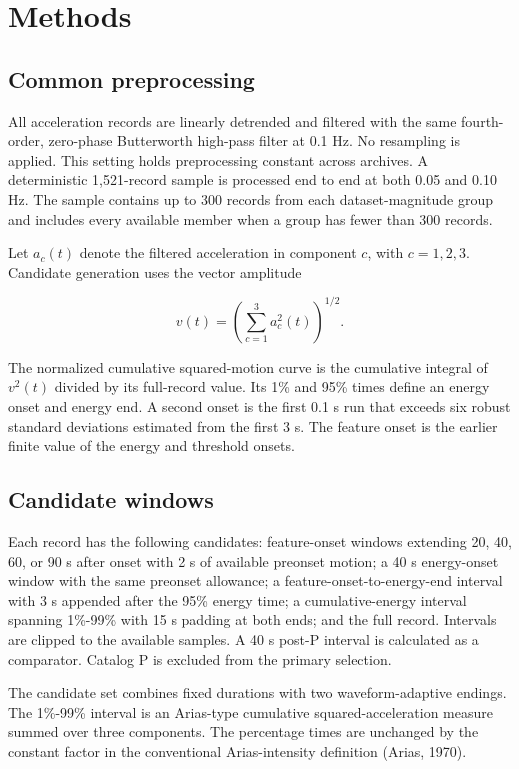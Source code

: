 \documentclass[12pt,letterpaper]{article}
\begin{document}
\section{Methods}\label{methods}

\subsection{Common preprocessing}\label{common-preprocessing}

All acceleration records are linearly detrended and filtered with the same fourth-order, zero-phase Butterworth high-pass filter at 0.1 Hz. No resampling is applied. This setting holds preprocessing constant across archives. A deterministic 1,521-record sample is processed end to end at both 0.05 and 0.10 Hz. The sample contains up to 300 records from each dataset-magnitude group and includes every available member when a group has fewer than 300 records.

Let \(a_c(t)\) denote the filtered acceleration in component \(c\), with \(c=1,2,3\). Candidate generation uses the vector amplitude

\[
v(t)=\left(\sum_{c=1}^{3}a_c^2(t)\right)^{1/2}.
\]

The normalized cumulative squared-motion curve is the cumulative integral of \(v^2(t)\) divided by its full-record value. Its 1\% and 95\% times define an energy onset and energy end. A second onset is the first 0.1 s run that exceeds six robust standard deviations estimated from the first 3 s. The feature onset is the earlier finite value of the energy and threshold onsets.

\subsection{Candidate windows}\label{candidate-windows}

Each record has the following candidates: feature-onset windows extending 20, 40, 60, or 90 s after onset with 2 s of available preonset motion; a 40 s energy-onset window with the same preonset allowance; a feature-onset-to-energy-end interval with 3 s appended after the 95\% energy time; a cumulative-energy interval spanning 1\%-99\% with 15 s padding at both ends; and the full record. Intervals are clipped to the available samples. A 40 s post-P interval is calculated as a comparator. Catalog P is excluded from the primary selection.

The candidate set combines fixed durations with two waveform-adaptive endings. The 1\%-99\% interval is an Arias-type cumulative squared-acceleration measure summed over three components. The percentage times are unchanged by the constant factor in the conventional Arias-intensity definition (Arias, 1970).
\end{document}
